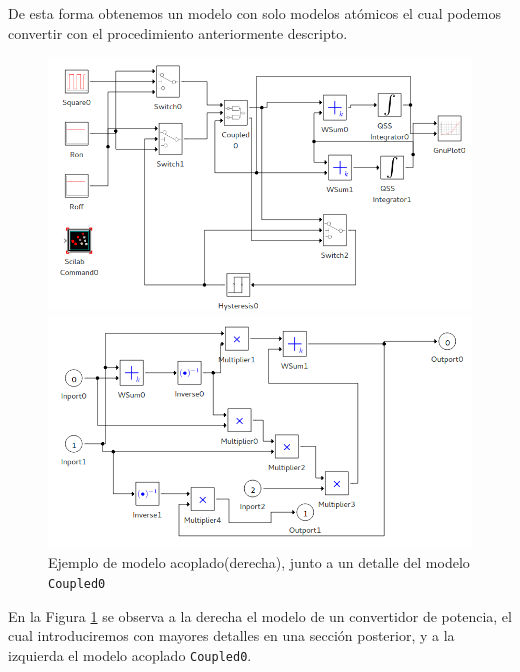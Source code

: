         De esta forma obtenemos un modelo con solo modelos atómicos el cual podemos convertir con el procedimiento anteriormente descripto.

\begin{figure}[H]
        \begin{minipage}{0.5\textwidth}
        \includegraphics[width=\linewidth]{buck_disk}
        \end{minipage}
        \begin{minipage}{0.5\textwidth}
        \includegraphics[width=\linewidth]{buck_disk_coupled0}
        \end{minipage}
 \caption{Ejemplo de modelo acoplado(derecha), junto a un detalle del modelo \texttt{Coupled0}}\label{fig:coupledsample}
\end{figure}

        En la Figura \ref{fig:coupledsample}  se observa a la derecha el modelo de un convertidor de potencia, el cual introduciremos con mayores
	 detalles en una sección posterior, y a la izquierda el modelo acoplado \texttt{Coupled0}.

